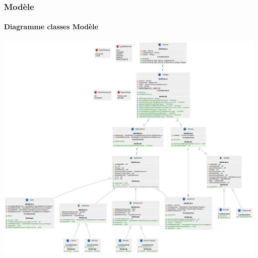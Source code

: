\documentclass{beamer}
\begin{document}
    \begin{frame}
        \frametitle{Modèle}
        \framesubtitle{Diagramme classes Modèle}
        \begin{center}
            \includegraphics[scale=0.13]{images/ClassesModel.png}
        \end{center}
    \end{frame}
\end{document}
